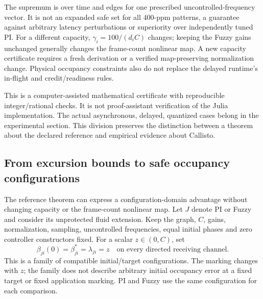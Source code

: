 The supremum is over time and edges for one prescribed uncontrolled-frequency
vector. It is not an expanded safe set for all 400-ppm patterns, a guarantee
against arbitrary latency perturbations or superiority over independently
tuned PI. For a different capacity, $\gamma_i=100/(d_iC)$ changes; keeping
the Fuzzy gains unchanged generally changes the frame-count nonlinear
map. A new capacity certificate requires a fresh derivation or a verified
map-preserving normalization change. Physical occupancy constraints also
do not replace the delayed runtime's in-flight and credit/readiness rules.

This is a computer-assisted mathematical certificate with reproducible
integer/rational checks. It is not proof-assistant verification of the
Julia implementation. The actual asynchronous, delayed, quantized cases
belong in the experimental section. This division preserves the distinction
between a theorem about the declared reference and empirical evidence
about Callisto.


\subsection{From excursion bounds to safe occupancy configurations}
\label{detail:subsec:btd_occupancy_translation}
The reference theorem can express a configuration-domain advantage
without changing capacity or the frame-count nonlinear map.
Let $J$ denote PI or Fuzzy and consider its unprotected fluid
extension. Keep the graph, $C$, gains, normalization, sampling,
uncontrolled frequencies, equal initial phases and zero controller
constructors fixed. For a scalar $z\in(0,C)$, set
\begin{equation}
 \beta_{ji}(0)=\beta_{ji}^*=\lambda_{ji}=z
 \quad\text{on every directed receiving channel}.
 \label{detail:eq:btd_translated_configuration}
\end{equation}
This is a family of compatible initial/target configurations.
The marking changes with $z$; the family does not describe arbitrary
initial occupancy error at a fixed target or fixed application marking.
PI and Fuzzy use the same configuration for each comparison.

